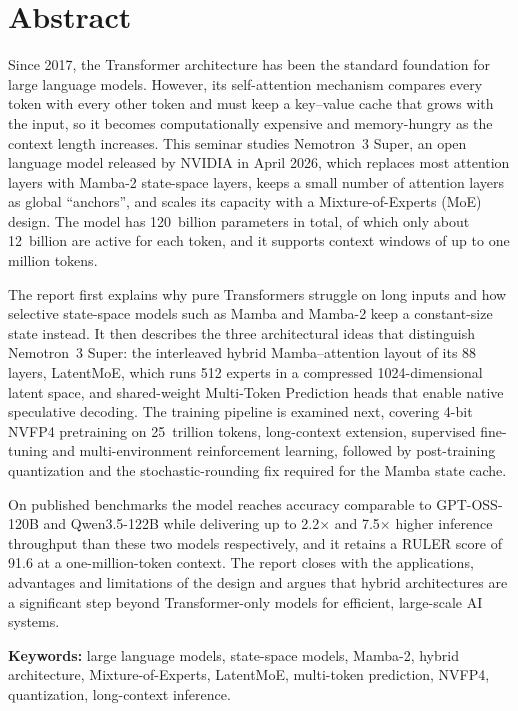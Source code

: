 \chapter*{Abstract}

Since 2017, the Transformer architecture has been the standard foundation for
large language models. However, its self-attention mechanism compares every
token with every other token and must keep a key--value cache that grows with
the input, so it becomes computationally expensive and memory-hungry as the
context length increases. This seminar studies Nemotron~3 Super, an open
language model released by NVIDIA in April 2026, which replaces most attention
layers with Mamba-2 state-space layers, keeps a small number of attention
layers as global ``anchors'', and scales its capacity with a Mixture-of-Experts
(MoE) design. The model has 120~billion parameters in total, of which only
about 12~billion are active for each token, and it supports context windows of
up to one million tokens.

The report first explains why pure Transformers struggle on long inputs and how
selective state-space models such as Mamba and Mamba-2 keep a constant-size
state instead. It then describes the three architectural ideas that distinguish
Nemotron~3 Super: the interleaved hybrid Mamba--attention layout of its 88
layers, LatentMoE, which runs 512 experts in a compressed 1024-dimensional
latent space, and shared-weight Multi-Token Prediction heads that enable native
speculative decoding. The training pipeline is examined next, covering 4-bit
NVFP4 pretraining on 25~trillion tokens, long-context extension, supervised
fine-tuning and multi-environment reinforcement learning, followed by
post-training quantization and the stochastic-rounding fix required for the
Mamba state cache.

On published benchmarks the model reaches accuracy comparable to
GPT-OSS-120B and Qwen3.5-122B while delivering up to 2.2$\times$ and
7.5$\times$ higher inference throughput than these two models respectively, and
it retains a RULER score of 91.6 at a one-million-token context. The report
closes with the applications, advantages and limitations of the design and
argues that hybrid architectures are a significant step beyond
Transformer-only models for efficient, large-scale AI systems.

\vspace{0.6cm}
\noindent\textbf{Keywords:} large language models, state-space models, Mamba-2,
hybrid architecture, Mixture-of-Experts, LatentMoE, multi-token prediction,
NVFP4, quantization, long-context inference.

\vspace{0.8cm}
\noindent\textbf{\MakeUppercase{\studentname}}\\
\registerno
